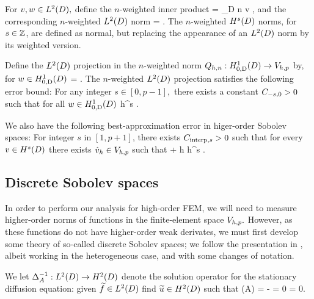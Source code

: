 For $v,w \in \LtD,$ define the $n$-weighted inner product
\beqs
{} = \int_{D} n v \wbar,
\eeqs
and the corresponding $n$-weighted $\LtD$ norm
\beqs
{} = .
\eeqs
The $n$-weighted $\HsD$ norms, for $s \in \mathbb Z$, are defined as normal, but replacing the appearance of an $\LtD$ norm by its weighted version.

Define the $\LtD$ projection in the $n$-weighted norm $\Qhn:\HozDD\rightarrow \Vhp$ by, for $w \in \HozDD$
\beqs
{} =  \tforall \vh \in \Vhp.
\eeqs
The $n$-weighted $\LtD$ projection satisfies the following error bound:
\label{lem:wltdprojerr}
For any integer $s \in [0,p-1],$ there exists a constant $C_{-s,0} >0$ such that for all $w \in \HozDD$
\beq\label{eq:wltdprojerr}
 \leq \Cmso h^{s} .
\eeq
\ele{}

We also have the following best-approximation error in higer-order Sobolev spaces:
\label{lem:bestapproxhigh}
For integer $s$ in $[1,p+1]$, there exists $C_{\mathrm{interp},s}>0$ such that for every $v \in \HsD$ there exists $\hat{v}_{h} \in V_{h,p}$ such that
\beqs
{} + h \leq \Cinterps h^s .
\eeqs
\ele



\subsection{Discrete Sobolev spaces}\label{sec:discsob}
In order to perform our analysis for high-order FEM, we will need to measure higher-order norms of functions in the finite-element space $V_{h,p}.$ However, as these functions do not have higher-order weak derivates, we must first develop some theory of so-called discrete Sobolev spaces; we follow the presentation in \cite{DuWu:15}, albeit working in the heterogeneous case, and with some changes of notation.

We let $\DeltaAI:\LtD\rightarrow\HtD$ denote the solution operator for the stationary diffusion equation: given $\ftilde \in \LtD$ find $\utilde \in \HtD$ such that
\beqs
\grad \cdot \mleft(A\grad \utilde\mright) = -\ftilde
\eeqs
\beqs
\trD \utilde = 0
\eeqs
\beqs
\dn \utilde = 0.
\eeqs
{}


